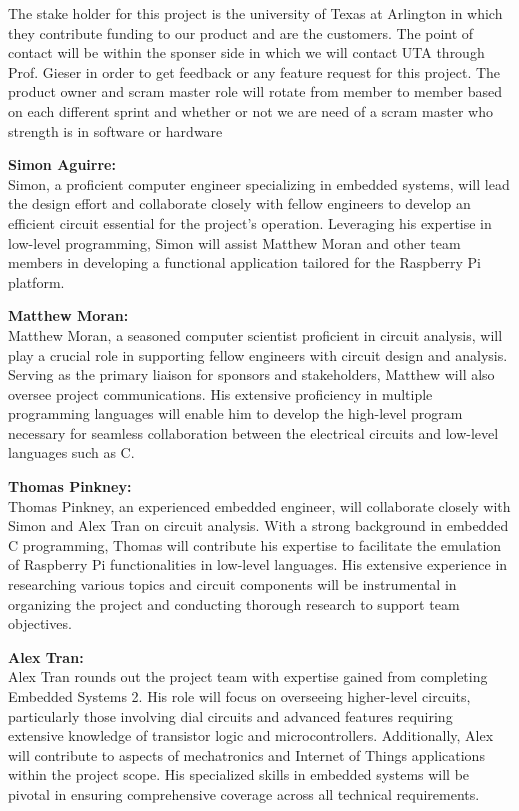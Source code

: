 The stake holder for this project is the university of Texas at Arlington in which they contribute funding to our product and are the customers. The point of contact will be within the sponser side in which we will contact UTA through Prof. Gieser in order to get feedback or any feature request for this project. The product owner and scram master role will rotate from member to member based on each different sprint and whether or not we are need of a scram master who strength is in software or hardware

\textbf{Simon Aguirre:} \\
Simon, a proficient computer engineer specializing in embedded systems, will lead the design effort and collaborate closely with fellow engineers to develop an efficient circuit essential for the project's operation. Leveraging his expertise in low-level programming, Simon will assist Matthew Moran and other team members in developing a functional application tailored for the Raspberry Pi platform.

\textbf{Matthew Moran:} \\
Matthew Moran, a seasoned computer scientist proficient in circuit analysis, will play a crucial role in supporting fellow engineers with circuit design and analysis. Serving as the primary liaison for sponsors and stakeholders, Matthew will also oversee project communications. His extensive proficiency in multiple programming languages will enable him to develop the high-level program necessary for seamless collaboration between the electrical circuits and low-level languages such as C.

\textbf{Thomas Pinkney:} \\
Thomas Pinkney, an experienced embedded engineer, will collaborate closely with Simon and Alex Tran on circuit analysis. With a strong background in embedded C programming, Thomas will contribute his expertise to facilitate the emulation of Raspberry Pi functionalities in low-level languages. His extensive experience in researching various topics and circuit components will be instrumental in organizing the project and conducting thorough research to support team objectives.

\textbf{Alex Tran:} \\
Alex Tran rounds out the project team with expertise gained from completing Embedded Systems 2. His role will focus on overseeing higher-level circuits, particularly those involving dial circuits and advanced features requiring extensive knowledge of transistor logic and microcontrollers. Additionally, Alex will contribute to aspects of mechatronics and Internet of Things applications within the project scope. His specialized skills in embedded systems will be pivotal in ensuring comprehensive coverage across all technical requirements.



